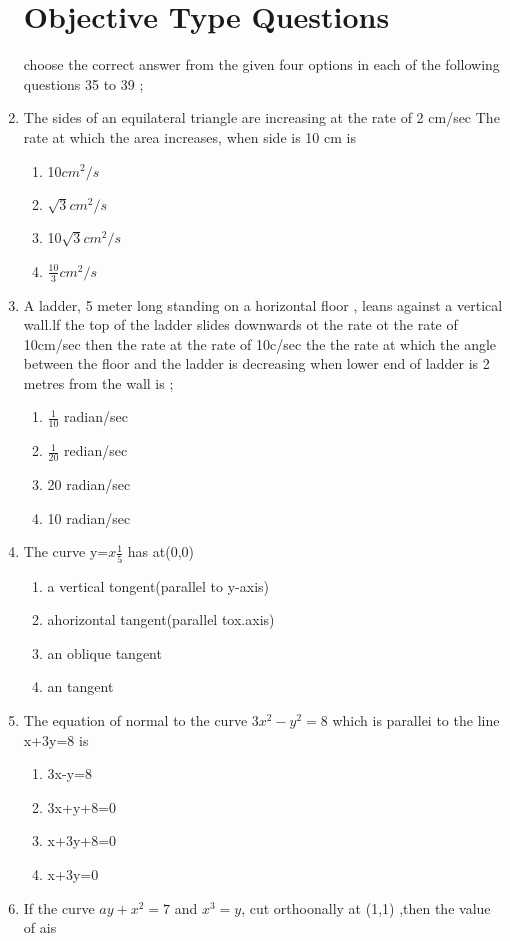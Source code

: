 \documentclass[12pt]{article}
\begin{document}
\begin{enumerate}
	\section*{Objective Type Questions}
choose the correct answer from the given four options in each of the following questions 35 to 39 ;
\item The sides of an equilateral triangle are increasing at the rate of 2 cm/sec The rate at which the area increases, when side is 10 cm is
\begin{enumerate}
\item 10$cm^2/s$
\item $\sqrt{3}cm^2/s$
\item 10$\sqrt{3}cm^2/s$
\item $\frac{10}{3}cm^2/s$
\end{enumerate}
\item A ladder, 5 meter long standing on a horizontal floor , leans against a vertical wall.lf the top of the ladder slides downwards ot the rate ot the rate of 10cm/sec then the rate at the rate of 10c/sec the the rate at which the angle between the floor and the ladder is decreasing when lower end of ladder is 2 metres from the wall is  ;
\begin{enumerate}
\item $\frac{1}{10}$ radian/sec
\item $\frac{1}{20}$ redian/sec
\item 20 radian/sec
\item 10 radian/sec
\end{enumerate}
\item The curve y=$x\frac{1}{5}$ has at(0,0)
\begin{enumerate}
\item a vertical tongent(parallel to y-axis)
\item ahorizontal tangent(parallel tox.axis)
\item an oblique tangent
\item an  tangent
\end{enumerate}
 \item The equation of normal to the curve $3x^2-y^2 =8$ which is parallei to the line x+3y=8 is
 \begin{enumerate}
 \item 3x-y=8
 \item 3x+y+8=0
 \item x+3y+8=0
 \item x+3y=0
 \end{enumerate}
 \item If the curve $ay+x^2=7$ and $x^3=y$, cut orthoonally at (1,1) ,then the value of ais

\end{enumerate}
\end{document}
